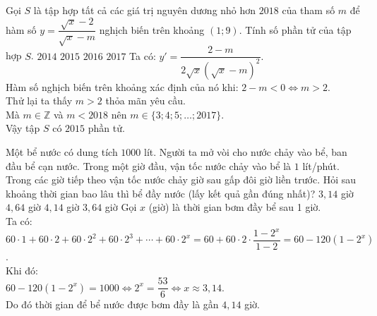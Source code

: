 \begin{ex}%
Gọi $S$ là tập hợp tất cả các giá trị nguyên dương nhỏ hơn $2018$ của tham số $m$ để hàm số $y=\dfrac{\sqrt{x}-2}{\sqrt{x}-m}$ nghịch biến trên khoảng $(1;9)$. Tính số phần tử của tập hợp $S$.
 \choice
  {$2014$}
  {\True $2015$}
  {$2016$}
  {$2017$}
 \loigiai
  {
  Ta có: $y'=\dfrac{2-m}{2\sqrt{x}\left(\sqrt{x}-m\right)^2}$.\\
  Hàm số nghịch biến trên khoảng xác định của nó khi: $2-m<0 \Leftrightarrow m>2$.\\
  Thử lại ta thấy $m>2$ thỏa mãn yêu cầu.\\
  Mà $m\in \mathbb{Z}$ và $m<2018$ nên $m \in \{3;4;5;\ldots;2017\}$.\\
  Vậy tập $S$ có $2015$ phần tử.
  }
\end{ex}



\begin{ex}%
Một bể nước có dung tích $1000$ lít. Người ta mở vòi cho nước chảy vào bể, ban đầu bể cạn nước. Trong một giờ đầu, vận tốc nước chảy vào bể là $1$ lít/phút. Trong các giờ tiếp theo vận tốc nước chảy giờ sau gấp đôi giờ liền trước. Hỏi sau khoảng thời gian bao lâu thì bể đầy nước (lấy kết quả gần đúng nhất)?
 \choice
  {$3,14$ giờ}
  {$4,64$ giờ}
  {\True $4,14$ giờ}
  {$3,64$ giờ}
 \loigiai
  {
  Gọi $x$ (giờ) là thời gian bơm đầy bể sau 1 giờ.\\
  Ta có:\\
  $60\cdot 1 + 60\cdot 2 + 60\cdot 2^2 +60\cdot 2^3+\cdots+60\cdot 2^x=60+60\cdot 2\cdot\dfrac{1-2^x}{1-2}=60-120(1-2^x)$.\\
  Khi đó:\\
  $60-120(1-2^x)=1000 \Leftrightarrow 2^x=\dfrac{53}{6}\Leftrightarrow x \approx 3,14$.\\
  Do đó thời gian để bể nước được bơm đầy là gần $4,14$ giờ.
  }
\end{ex}



